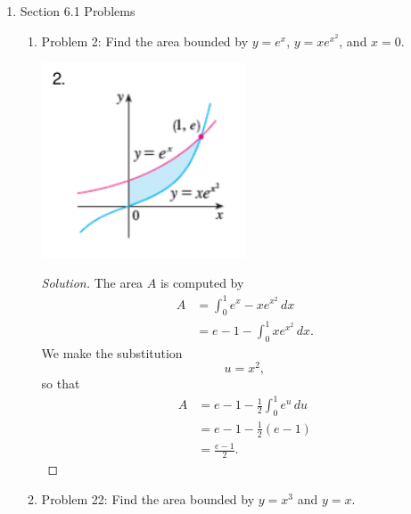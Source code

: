 \documentclass{article}
\theoremstyle{plain}
\theoremstyle{definition}
\begin{document}
\begin{enumerate}
\begin{enumerate}
\begin{proof}[Solution]
\begin{align}
                                     & = \frac{1}{2}\left(\frac{2}{5}u^{5/2} - \frac{2}{3}u^{3/2}\right) + C              \\
                                     & = \frac{1}{2}\left(\frac{2}{5}(x^2+1)^{5/2} - \frac{2}{3}(x^2+1)^{3/2}\right) + C.
          \end{align}
        \end{proof}
    \end{enumerate}
  \item Section 6.1 Problems
    \begin{enumerate}
      \item Problem 2: Find the area bounded by $y = e^x$, $y = xe^{x^2}$, and $x = 0$.
        \begin{center}
          \includegraphics[width=0.5\textwidth]{problem-6-1-2.png}
        \end{center}
        \begin{proof}[Solution]
          The area $A$ is computed by
          \begin{align}
            A & = \int_0^1 e^x - xe^{x^2}\,dx  \\
              & = e-1 - \int_0^1 xe^{x^2}\,dx.
          \end{align}
          We make the substitution
          \begin{equation}
            u = x^2,
          \end{equation}
          so that
          \begin{align}
            A & = e - 1 - \frac{1}{2}\int_0^1 e^u\,du \\
              & = e - 1 - \frac{1}{2}(e - 1)          \\
              & = \frac{e-1}{2}.
          \end{align}
        \end{proof}
      \item Problem 22: Find the area bounded by $y = x^3$ and $y = x$.

\end{enumerate}
\end{enumerate}
\end{document}
